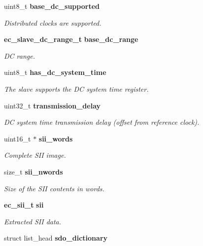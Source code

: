 \begin{DoxyCompactItemize}
uint8\-\_\-t {\bf base\-\_\-dc\-\_\-supported}
\begin{DoxyCompactList}\small\item\em \-Distributed clocks are supported. \end{DoxyCompactList}\item 
{\bf ec\-\_\-slave\-\_\-dc\-\_\-range\-\_\-t} {\bf base\-\_\-dc\-\_\-range}
\begin{DoxyCompactList}\small\item\em \-D\-C range. \end{DoxyCompactList}\item 
uint8\-\_\-t {\bf has\-\_\-dc\-\_\-system\-\_\-time}
\begin{DoxyCompactList}\small\item\em \-The slave supports the \-D\-C system time register. \end{DoxyCompactList}\item 
uint32\-\_\-t {\bf transmission\-\_\-delay}
\begin{DoxyCompactList}\small\item\em \-D\-C system time transmission delay (offset from reference clock). \end{DoxyCompactList}\item 
uint16\-\_\-t $\ast$ {\bf sii\-\_\-words}
\begin{DoxyCompactList}\small\item\em \-Complete \-S\-I\-I image. \end{DoxyCompactList}\item 
size\-\_\-t {\bf sii\-\_\-nwords}
\begin{DoxyCompactList}\small\item\em \-Size of the \-S\-I\-I contents in words. \end{DoxyCompactList}\item 
{\bf ec\-\_\-sii\-\_\-t} {\bf sii}
\begin{DoxyCompactList}\small\item\em \-Extracted \-S\-I\-I data. \end{DoxyCompactList}\item 
struct list\-\_\-head {\bf sdo\-\_\-dictionary}\label{structec__slave_a2754265971634ba5f97ce28fc1029d58}


\end{DoxyCompactItemize}
